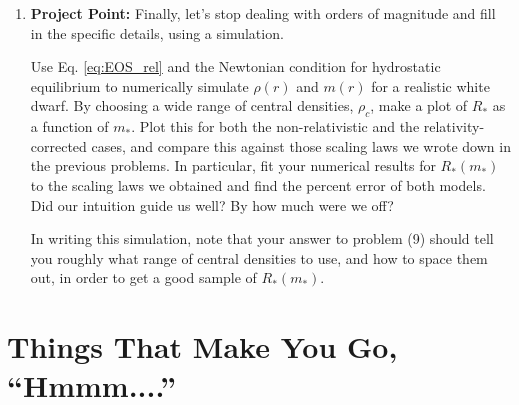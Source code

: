 \documentclass[11pt]{article}
\begin{document}
\begin{enumerate}
\item \textbf{Project Point:} Finally, let's stop dealing with orders of magnitude and fill in the specific details, using a simulation.

\hspace{15pt} Use Eq. \ref{eq:EOS_rel} and the Newtonian condition for hydrostatic equilibrium to numerically simulate $\rho(r)$ and $m(r)$ for a realistic white dwarf. By choosing a wide range of central densities, $\rho_c$, make a plot of $R_*$ as a function of $m_*$. Plot this for both the non-relativistic and the relativity-corrected cases, and compare this against those scaling laws we wrote down in the previous problems. In particular, fit your numerical results for $R_*(m_*)$ to the scaling laws we obtained and find the percent error of both models. Did our intuition guide us well? By how much were we off?

\hspace{15pt} In writing this simulation, note that your answer to problem (9) should tell you roughly what range of central densities to use, and how to space them out, in order to get a good sample of $R_*(m_*)$.

\end{enumerate}

\vspace{1000pt}

\section*{Things That Make You Go, ``Hmmm....''}
\end{document}
